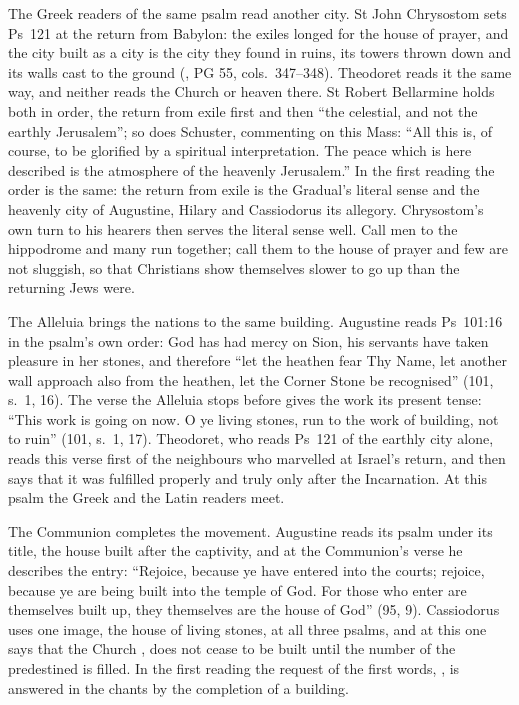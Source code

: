 The Greek readers of the same psalm read another city. St John Chrysostom sets
Ps~121 at the return from Babylon: the exiles longed for the house of prayer,
and the city built as a city is the city they found in ruins, its towers thrown
down and its walls cast to the ground (, PG 55,
cols.~347--348). Theodoret reads it the same way, and neither reads the Church
or heaven there. St Robert Bellarmine holds both in order, the return from
exile first and then ``the celestial, and not the earthly Jerusalem''; so does
Schuster, commenting on this Mass: ``All this is, of course, to be glorified by
a spiritual interpretation. The peace which is here described is the
atmosphere of the heavenly Jerusalem.'' In the first reading the order is the
same: the return from exile is the Gradual's literal sense and the heavenly
city of Augustine, Hilary and Cassiodorus its allegory. Chrysostom's own turn
to his hearers then serves the literal sense well. Call men to the hippodrome
and many run together; call them to the house of prayer and few are not
sluggish, so that Christians show themselves slower to go up than the returning
Jews were.

The Alleluia brings the nations to the same building. Augustine reads
Ps~101:16 in the psalm's own order: God has had mercy on Sion, his servants have
taken pleasure in her stones, and therefore ``let the heathen fear Thy Name, let
another wall approach also from the heathen, let the Corner Stone be
recognised'' (101, s.~1, 16). The verse the Alleluia stops before gives the work
its present tense: ``This work is going on now. O ye living stones, run to the
work of building, not to ruin'' (101, s.~1, 17). Theodoret, who reads Ps~121 of
the earthly city alone, reads this verse first of the neighbours who marvelled
at Israel's return, and then says that it was fulfilled properly and truly only
after the Incarnation. At this psalm the Greek and the Latin readers meet.

The Communion completes the movement. Augustine reads its psalm under its
title, the house built after the captivity, and at the Communion's verse he
describes the entry: ``Rejoice, because ye have entered into the courts;
rejoice, because ye are being built into the temple of God. For those who enter
are themselves built up, they themselves are the house of God'' (95, 9).
Cassiodorus uses one image, the house of living stones, at all three psalms, and
at this one says that the Church , does not cease to be built
until the number of the predestined is filled. In the first reading the request
of the first words, , is answered in the chants by the
completion of a building.

